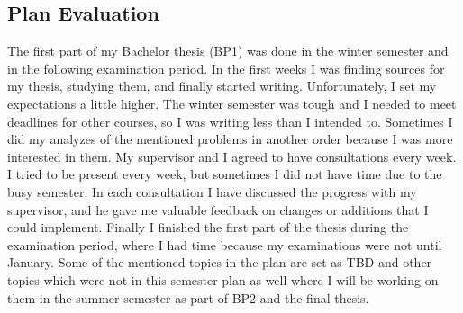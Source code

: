 \begin{refsegment}

\section{Plan Evaluation}
The first part of my Bachelor thesis (BP1) was done in the winter semester and in the following examination period. In the first weeks I was finding sources for my thesis, studying them, and finally started writing. Unfortunately, I set my expectations a little higher. The winter semester was tough and I needed to meet deadlines for other courses, so I was writing less than I intended to. Sometimes I did my analyzes of the mentioned problems in another order because I was more interested in them. My supervisor and I agreed to have consultations every week. I tried to be present every week, but sometimes I did not have time due to the busy semester. In each consultation I have discussed the progress with my supervisor, and he gave me valuable feedback on changes or additions that I could implement. Finally I finished the first part of the thesis during the examination period, where I had time because my examinations were not until January. Some of the mentioned topics in the plan are set as TBD and other topics which were not in this semester plan as well where I will be working on them in the summer semester as part of BP2 and the final thesis.



\printbibliography[heading=referencessec,segment=\therefsegment,resetnumbers=true]

\end{refsegment}
